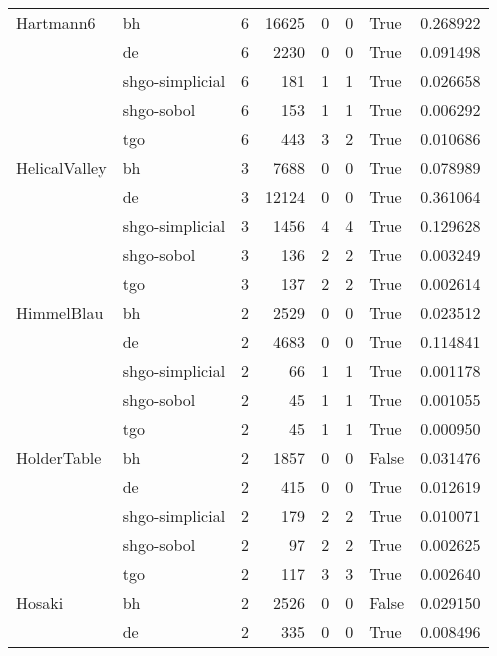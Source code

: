 \begin{longtable}{llrrrrlr}
Hartmann6 & bh &     6 &    16625 &      0 &       0 &    True &    0.268922 \\
         & de &     6 &     2230 &      0 &       0 &    True &    0.091498 \\
         & shgo-simplicial &     6 &      181 &      1 &       1 &    True &    0.026658 \\
         & shgo-sobol &     6 &      153 &      1 &       1 &    True &    0.006292 \\
         & tgo &     6 &      443 &      3 &       2 &    True &    0.010686 \\
HelicalValley & bh &     3 &     7688 &      0 &       0 &    True &    0.078989 \\
         & de &     3 &    12124 &      0 &       0 &    True &    0.361064 \\
         & shgo-simplicial &     3 &     1456 &      4 &       4 &    True &    0.129628 \\
         & shgo-sobol &     3 &      136 &      2 &       2 &    True &    0.003249 \\
         & tgo &     3 &      137 &      2 &       2 &    True &    0.002614 \\
HimmelBlau & bh &     2 &     2529 &      0 &       0 &    True &    0.023512 \\
         & de &     2 &     4683 &      0 &       0 &    True &    0.114841 \\
         & shgo-simplicial &     2 &       66 &      1 &       1 &    True &    0.001178 \\
         & shgo-sobol &     2 &       45 &      1 &       1 &    True &    0.001055 \\
         & tgo &     2 &       45 &      1 &       1 &    True &    0.000950 \\
HolderTable & bh &     2 &     1857 &      0 &       0 &   False &    0.031476 \\
         & de &     2 &      415 &      0 &       0 &    True &    0.012619 \\
         & shgo-simplicial &     2 &      179 &      2 &       2 &    True &    0.010071 \\
         & shgo-sobol &     2 &       97 &      2 &       2 &    True &    0.002625 \\
         & tgo &     2 &      117 &      3 &       3 &    True &    0.002640 \\
Hosaki & bh &     2 &     2526 &      0 &       0 &   False &    0.029150 \\
         & de &     2 &      335 &      0 &       0 &    True &    0.008496 \\

\end{longtable}
